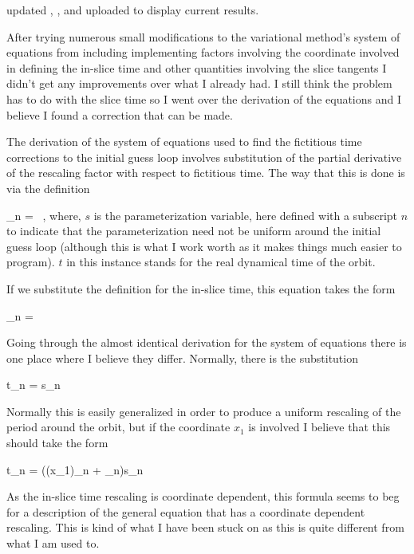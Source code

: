 updated , , and uploaded  to display
current results.

After trying numerous small modifications to the variational method's system
of equations from  including implementing factors involving
the coordinate involved in defining the in-slice time and other quantities
involving the slice tangents I didn't get any improvements over what I already
had. I still think the problem has to do with the slice time so I went over
the derivation of the equations and I believe I found a correction that can be
made.

The derivation of the system of equations used to find the fictitious time
corrections to the initial guess loop involves substitution of the
partial derivative of the rescaling factor with respect to fictitious time.
The way that this is done is via the definition

\beq
\lambda_n =  \, ,
\eeq
where, $s$ is the parameterization variable, here defined with a subscript $n$
to indicate that the parameterization need not be uniform around the initial guess
loop (although this is what I work worth as it makes things much easier to program).
$t$ in this instance stands for the real dynamical time of the orbit.

If we substitute the definition for the in-slice time, this equation takes the form

\beq
\lambda_n = 
\eeq

Going through the almost identical derivation for the system of equations there
is one place where I believe they differ. Normally, there is the substitution

\beq
\delta t_n =  \Delta s_n \delta \tau
\eeq

Normally this is easily generalized in order to produce a uniform rescaling of the period
around the orbit,
but if the coordinate $x_1$ is involved I believe that this should take the form

\beq \label{e-inslicevarmeth}
\delta t_n = ((x_1)_n +  \lambda_n)\Delta s_n \delta \tau
\eeq

As the in-slice time rescaling is coordinate dependent, this formula seems to beg for a description
of the general equation that has a coordinate dependent rescaling. This is kind of what I have been stuck on
as this is quite different from what I am used to.

